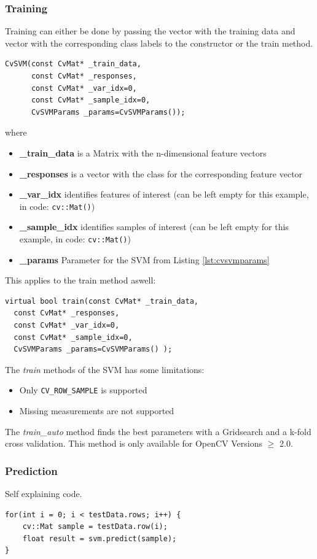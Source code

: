 \subsubsection*{Training}
Training can either be done by passing the vector with the training data and vector with the corresponding class labels to the constructor or the train method.
\begin{lstlisting}
CvSVM(const CvMat* _train_data, 
      const CvMat* _responses,
      const CvMat* _var_idx=0,
      const CvMat* _sample_idx=0,
      CvSVMParams _params=CvSVMParams());
\end{lstlisting}
where
\begin{itemize}
 \item \textbf{\_train\_data} is a Matrix with the n-dimensional feature vectors
 \item \textbf{\_responses} is a vector with the class for the corresponding feature vector
 \item \textbf{\_var\_idx} identifies features of interest (can be left empty for this example, in code: \texttt{cv::Mat()})
 \item \textbf{\_sample\_idx} identifies samples of interest (can be left empty for this example, in code: \texttt{cv::Mat()})
 \item \textbf{\_params} Parameter for the SVM from Listing \ref{lst:cvsvmparams}
\end{itemize}
This applies to the train method aswell:
\begin{lstlisting}
virtual bool train(const CvMat* _train_data, 
  const CvMat* _responses,
  const CvMat* _var_idx=0,
  const CvMat* _sample_idx=0,
  CvSVMParams _params=CvSVMParams() );
\end{lstlisting}

The \textit{train} methods of the SVM has some limitations:
 \begin{itemize}
  \item Only \verb|CV_ROW_SAMPLE| is supported
  \item Missing measurements are not supported
 \end{itemize}
The \textit{train\_auto} method finds the best parameters with a Gridsearch and a k-fold cross validation. This method is only available for OpenCV Versions $\geq$ 2.0.

\subsubsection*{Prediction}
Self explaining code.
\begin{lstlisting}
for(int i = 0; i < testData.rows; i++) {
	cv::Mat sample = testData.row(i);
	float result = svm.predict(sample);
}
\end{lstlisting}

